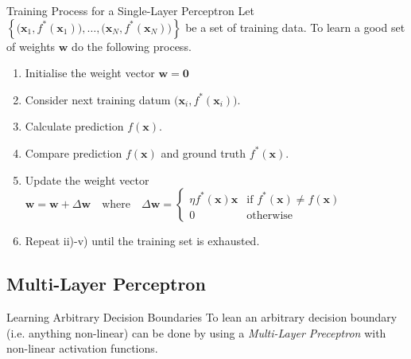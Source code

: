 \documentclass[11pt,a4paper]{article}
\begin{document}
  \begin{proposition}{Training Process for a Single-Layer Perceptron}
    Let $\left\{\big(\pmb{x}_1,f^*(\pmb{x}_1)\big),\dots,\big(\pmb{x}_N,f^*(\pmb{x}_N)\big)\right\}$ be a set of training data. To learn a good set of weights $\pmb{w}$ do the following process.
    \begin{enumerate}
      \item Initialise the weight vector $\pmb{w}=\pmb0$
      \item Consider next training datum $\big(\pmb{x}_i,f^*(\pmb{x}_i)\big)$.
      \item Calculate prediction $f(\pmb{x})$.
      \item Compare prediction $f(\pmb{x})$ and ground truth $f^*(\pmb{x})$.
      \item Update the weight vector $\pmb{w}=\pmb{w}+\Delta\pmb{w}\quad\text{where}\quad\Delta\pmb{w}=\begin{cases}\eta f^*(\pmb{x})\pmb{x}&\text{if }f^*(\pmb{x})\neq f(\pmb{x})\\0&\text{otherwise}\end{cases}$
      \item Repeat ii)-v) until the training set is exhausted.
    \end{enumerate}
  \end{proposition}

\subsection{Multi-Layer Perceptron}

  \begin{remark}{Learning Arbitrary Decision Boundaries}
    To lean an arbitrary decision boundary (i.e. anything non-linear) can be done by using a \textit{Multi-Layer Preceptron} with non-linear activation functions.
  \end{remark}
\end{document}
